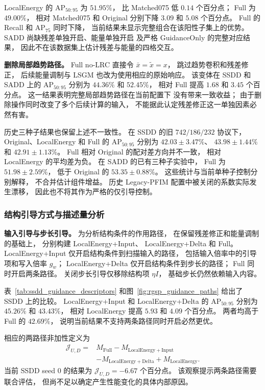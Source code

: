 \documentclass[journal]{IEEEtran}
\begin{document}
LocalEnergy 的 $\mathrm{AP}_{50:95}$ 为 $51.95\%$，
比 Matched075 低 $0.14$ 个百分点；
Full 为 $49.00\%$，
相对 Matched075 和 Original
分别下降 $3.09$ 和 $5.08$ 个百分点。
Full 的 Recall 和 $\mathrm{AP}_{75}$ 同时下降，
当前结果未显示完整组合在该阳性子集上的优势。
SADD 尚缺残差单独开启、能量单独开启
及严格 GuidanceOnly 的完整对应结果，
因此不在该数据集上估计残差与能量的四格交互。

\textbf{删除局部趋势路径。}
Full no-LRC 直接令
$\bar{x}=\widetilde{x}=x$，
跳过趋势卷积和残差修正，
后续能量调制与 LSGM 也改为使用相应的原始响应。
该变体在 SSDD 和 SADD 上的
$\mathrm{AP}_{50:95}$ 分别为
$44.36\%$ 和 $52.45\%$，
相对 Full 提高 $1.68$ 和 $3.45$ 个百分点。
这一结果表明完整局部趋势路径在当前配置下
没有带来一致收益；
由于删除操作同时改变了多个后续计算的输入，
不能据此认定残差修正这一单独因素必然有害。

历史三种子结果也保留上述不一致性。
在 SSDD 的旧 $742/186/232$ 协议下，
Original、LocalEnergy 和 Full 的
$\mathrm{AP}_{50:95}$ 分别为
$42.03\pm3.47\%$、
$43.98\pm1.44\%$ 和
$42.91\pm1.13\%$。
Full 相对 Original 的配对差方向并不一致，
相对 LocalEnergy 的平均差为负。
在 SADD 的已有三种子实验中，
Full 为 $51.98\pm2.59\%$，
低于 Original 的 $53.35\pm0.88\%$。
这些统计与当前单种子控制分别解释，
不合并估计组件增益。
历史 Legacy-PFIM 配置中被关闭的系数实际发生漂移，
因此也不将其作为严格的仅引导控制。

\subsubsection{结构引导方式与描述量分析}
\label{sec:guidance_design_analysis}

\textbf{输入引导与步长引导。}
为分析结构条件的作用路径，
在保留残差修正和能量调制的基础上，
分别构建 LocalEnergy+Input、
LocalEnergy+Delta 和 Full。
LocalEnergy+Input 仅开启结构条件到扫描输入的路径，
包括输入倍率中的引导项和写入倍率 $g_w$；
LocalEnergy+Delta 仅开启结构条件到步长的路径；
Full 同时开启两条路径。
关闭步长引导仅移除结构项 $\eta I$，
基础步长仍然依赖输入内容。

表~\ref{tab:ssdd_guidance_descriptors}
和图~\ref{fig:rgsp_guidance_paths}
给出了 SSDD 上的比较。
LocalEnergy+Input 和 LocalEnergy+Delta 的
$\mathrm{AP}_{50:95}$ 分别为
$45.26\%$ 和 $43.43\%$，
相对 LocalEnergy 提高
$5.93$ 和 $4.09$ 个百分点。
两者均高于 Full 的 $42.69\%$，
说明当前结果不支持两条路径同时开启必然更优。

相应的两路径非加性定义为
\begin{equation}
\begin{aligned}
\mathcal{J}_{U,D}
={}&M_{\mathrm{Full}}
-M_{\mathrm{LocalEnergy+Input}}\\
&-M_{\mathrm{LocalEnergy+Delta}}
+M_{\mathrm{LocalEnergy}}.
\end{aligned}
\label{eq:ablation_interaction_ud}
\end{equation}
当前 SSDD seed 0 的结果为
$\mathcal{J}_{U,D}=-6.67$ 个百分点。
该观察提示两条路径需要联合评估，
但尚不足以确定产生性能变化的具体内部原因。
\end{document}
